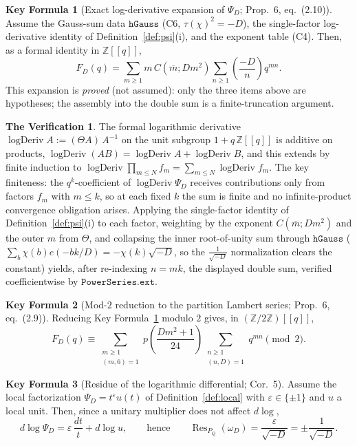 \documentclass[11pt]{article}
\newcommand{\Z}{\mathbb{Z}}
\newcommand{\leg}[2]{\left(\frac{#1}{#2}\right)}
\DeclareMathOperator{\Res}{Res}
\theoremstyle{definition}
\newtheorem{keyformula}{Key Formula}
\newtheorem{TV}{The Verification}
\begin{document}
\begin{keyformula}[Exact log-derivative expansion of $\Psi_D$; Prop.~6, eq.~(2.10)]\label{KF:logderiv}
Assume the Gauss-sum data $\mathtt{hGauss}$ (C6, $\tau(\chi)^2=-D$), the single-factor
log-derivative identity of Definition~\ref{def:psi}(i), and the exponent table (C4). Then, as a
formal identity in $\Z[[q]]$,
\[
F_D(q)=\sum_{m\ge1}m\,C(\overline m;Dm^2)\sum_{n\ge1}\leg{-D}{n}q^{mn}.
\]
This expansion is \emph{proved} (not assumed): only the three items above are hypotheses; the
assembly into the double sum is a finite-truncation argument.
\end{keyformula}
\begin{TV}
The formal logarithmic derivative $\operatorname{logDeriv}A:=(\Theta A)\,A^{-1}$ on the unit
subgroup $1+q\,\Z[[q]]$ is additive on products, $\operatorname{logDeriv}(AB)=
\operatorname{logDeriv}A+\operatorname{logDeriv}B$, and this extends by finite induction to
$\operatorname{logDeriv}\prod_{m\le N}f_m=\sum_{m\le N}\operatorname{logDeriv}f_m$. The key
finiteness: the $q^k$-coefficient of $\operatorname{logDeriv}\Psi_D$ receives contributions only
from factors $f_m$ with $m\le k$, so at each fixed $k$ the sum is finite and no infinite-product
convergence obligation arises. Applying the single-factor identity of Definition~\ref{def:psi}(i)
to each factor, weighting by the exponent $C(\overline m;Dm^2)$ and the outer $m$ from $\Theta$,
and collapsing the inner root-of-unity sum through $\mathtt{hGauss}$
($\sum_{b}\chi(b)e(-bk/D)=-\chi(k)\sqrt{-D}$, so the $\frac1{\sqrt{-D}}$ normalization clears the
constant) yields, after re-indexing $n=mk$, the displayed double sum, verified coefficientwise by
$\mathtt{PowerSeries.ext}$.
\end{TV}

\begin{keyformula}[Mod-$2$ reduction to the partition Lambert series; Prop.~6, eq.~(2.9)]\label{KF:lambert}
Reducing Key Formula~\ref{KF:logderiv} modulo $2$ gives, in $(\Z/2\Z)[[q]]$,
\[
F_D(q)\equiv\sum_{\substack{m\ge1\\(m,6)=1}}
p\!\left(\frac{Dm^2+1}{24}\right)\sum_{\substack{n\ge1\\(n,D)=1}}q^{mn}\pmod2 .
\]
\end{keyformula}

\begin{keyformula}[Residue of the logarithmic differential; Cor.~5]\label{KF:residue}
Assume the local factorization $\Psi_D=t^{\varepsilon}u(t)$ of Definition~\ref{def:local} with
$\varepsilon\in\{\pm1\}$ and $u$ a local unit. Then, since a unitary multiplier does not affect
$d\log$,
\[
d\log\Psi_D=\varepsilon\,\frac{dt}{t}+d\log u,
\qquad\text{hence}\qquad
\Res_{P_Q}(\omega_D)=\frac{\varepsilon}{\sqrt{-D}}=\pm\frac{1}{\sqrt{-D}} .
\]
\end{keyformula}
\end{document}
